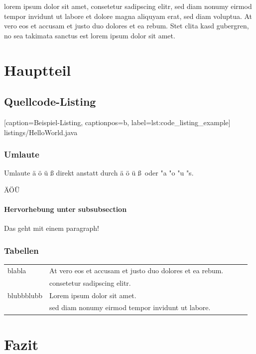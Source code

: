 \documentclass[11pt,a4paper,titlepage,ngerman]{article}
\begin{document}
\gls{lorem} \gls{ipsum} dolor sit amet, consetetur sadipscing elitr, sed diam nonumy eirmod tempor invidunt ut labore et dolore magna aliquyam erat, sed diam voluptua. At vero eos et accusam et justo duo dolores et ea rebum. Stet clita kasd gubergren, no sea takimata sanctus est \gls{lorem} ipsum dolor sit amet. 

\section{Hauptteil}

\subsection{Quellcode-Listing}


    [caption={Beispiel-Listing},
       captionpos=b, label=lst:code_listing_example]
 {listings/HelloWorld.java}

\subsubsection{Umlaute}

Umlaute ä ö ü ß direkt anstatt durch \"a \"o \"u \ss\ oder "a "o "u "s.

ÄÖÜ

\paragraph{Hervorhebung unter subsubsection}

Das geht mit einem paragraph!

\subsubsection{Tabellen}

\begin{table}[h]
\begin{tabular}{lllll}
blabla &  At vero eos et accusam et justo duo dolores et ea rebum.\\
       & consetetur sadipscing elitr. \\
blubbblubb &  Lorem ipsum dolor sit amet.\\
       & sed diam nonumy eirmod tempor invidunt ut labore. \\	   
\end{tabular}
\end{table}	


\section{Fazit}
\end{document}
